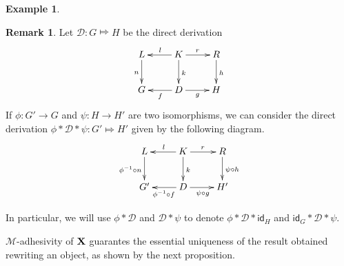\documentclass[a4paper]{article}
\newcommand{\id}[1]{\mathsf{id}_{#1}}
\def\X{\textbf {\textup{X}}}
\newcommand{\dder}[1]{\mathscr{#1}}
\theoremstyle{definition}
\newtheorem{remark}[theorem]{Remark}
\newtheorem{example}[theorem]{Example}
\begin{document}
\begin{example}
\end{example}

\begin{remark}\label{exa:conc} Let  $\dder{D}\colon G\Mapsto H$ be the direct derivation 
		\[\xymatrix{L \ar[d]_{n}& K \ar[d]^{k}\ar[l]_{l} \ar[r]^{r} & R \ar[d]^{h}\\G & \ar[l]^{f} D \ar[r]_{g}& H}\]
	If $\phi\colon G'\to G$ and $\psi\colon H\to H'$ are two isomorphisms, 	we can consider the direct derivation	$\phi * \dder{D}*\psi \colon G'\Mapsto H'$ given by the following diagram.
	\[\xymatrix{L \ar[d]_{\phi^{-1} \circ n}& K \ar[d]^{k}\ar[l]_{l} \ar[r]^{r} & R \ar[d]^{\psi \circ h}\\G' & \ar[l]^{\phi^{-1} \circ f} D \ar[r]_{\psi \circ g}& H'}\]
	
	In particular, we will use $\phi*\dder{D}$ and $\dder{D}*\psi$  to denote $\phi*\dder{D}*\id{H}$ and $\id{G}*\dder{D}*\psi$.
\end{remark}

$\mathcal{M}$-adhesivity of $\X$ guarantes the essential uniqueness of the result obtained rewriting an object, as shown by the next proposition.
\end{document}
